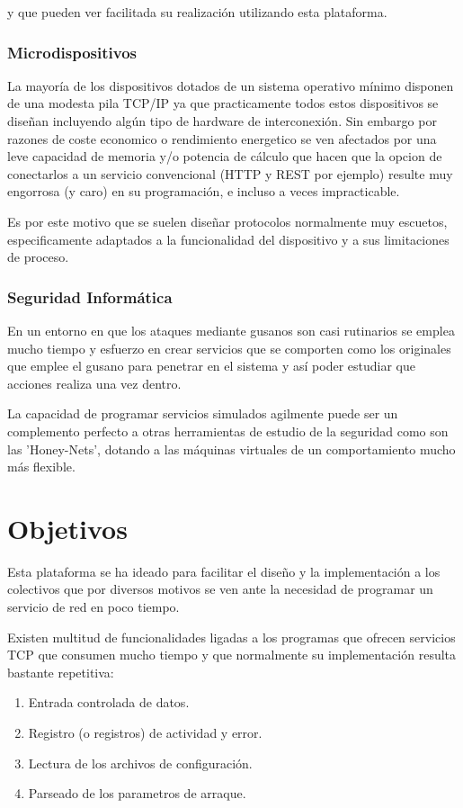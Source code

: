 \documentclass[a4paper,spanish,12pt]{book}
\begin{document}
y que pueden ver facilitada su realización utilizando esta plataforma.

\subsection{Microdispositivos}
La mayor\'ia de los dispositivos dotados de un sistema operativo m\'inimo disponen de una modesta pila TCP/IP ya que practicamente todos estos dispositivos se dise\~{n}an incluyendo algún tipo de hardware de interconexi\'on. Sin embargo por razones de coste economico o rendimiento energetico se ven afectados por una leve capacidad de memoria y/o potencia de c\'alculo que hacen que la opcion de conectarlos a un servicio convencional (HTTP y REST por ejemplo) resulte muy engorrosa (y caro) en su programaci\'on, e incluso a veces impracticable.

Es por este motivo que se suelen dise\~{n}ar protocolos normalmente muy escuetos, especificamente adaptados a la funcionalidad del dispositivo y a sus limitaciones de proceso.

\subsection{Seguridad Inform\'atica}
En un entorno en que los ataques mediante gusanos son casi rutinarios se emplea mucho tiempo y esfuerzo en crear servicios que se comporten como los originales que emplee el gusano para penetrar en el sistema y as\'i poder estudiar que acciones realiza una vez dentro.

La capacidad de programar servicios simulados agilmente puede ser un complemento perfecto a otras herramientas de estudio de la seguridad como son las 'Honey-Nets', dotando a las m\'aquinas virtuales de un comportamiento mucho m\'as flexible.


\chapter{Objetivos}

Esta plataforma se ha ideado para facilitar el diseño y la implementación a los colectivos que por diversos motivos se ven ante la necesidad de programar un servicio de red en poco tiempo. 

Existen multitud de funcionalidades ligadas a los programas que ofrecen servicios TCP que consumen mucho tiempo y que normalmente su implementaci\'on resulta bastante repetitiva:
\begin{enumerate}
	\item Entrada controlada de datos.
	\item Registro (o registros) de actividad y error.
	\item Lectura de los archivos de configuraci\'on.
	\item Parseado de los parametros de arraque.
\end{enumerate}
\end{document}
